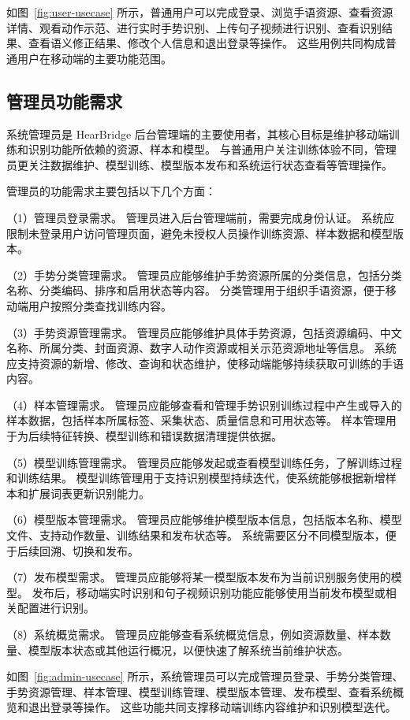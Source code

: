 如图~\ref{fig:user-usecase} 所示，普通用户可以完成登录、浏览手语资源、查看资源详情、观看动作示范、进行实时手势识别、上传句子视频进行识别、查看识别结果、查看语义修正结果、修改个人信息和退出登录等操作。
这些用例共同构成普通用户在移动端的主要功能范围。

\subsection{管理员功能需求}

系统管理员是 HearBridge 后台管理端的主要使用者，其核心目标是维护移动端训练和识别功能所依赖的资源、样本和模型。
与普通用户关注训练体验不同，管理员更关注数据维护、模型训练、模型版本发布和系统运行状态查看等管理操作。

管理员的功能需求主要包括以下几个方面：

（1）管理员登录需求。
管理员进入后台管理端前，需要完成身份认证。
系统应限制未登录用户访问管理页面，避免未授权人员操作训练资源、样本数据和模型版本。

（2）手势分类管理需求。
管理员应能够维护手势资源所属的分类信息，包括分类名称、分类编码、排序和启用状态等内容。
分类管理用于组织手语资源，便于移动端用户按照分类查找训练内容。

（3）手势资源管理需求。
管理员应能够维护具体手势资源，包括资源编码、中文名称、所属分类、封面资源、数字人动作资源或相关示范资源地址等信息。
系统应支持资源的新增、修改、查询和状态维护，使移动端能够持续获取可训练的手语内容。

（4）样本管理需求。
管理员应能够查看和管理手势识别训练过程中产生或导入的样本数据，包括样本所属标签、采集状态、质量信息和可用状态等。
样本管理用于为后续特征转换、模型训练和错误数据清理提供依据。

（5）模型训练管理需求。
管理员应能够发起或查看模型训练任务，了解训练过程和训练结果。
模型训练管理用于支持识别模型持续迭代，使系统能够根据新增样本和扩展词表更新识别能力。

（6）模型版本管理需求。
管理员应能够维护模型版本信息，包括版本名称、模型文件、支持动作数量、训练结果和发布状态等。
系统需要区分不同模型版本，便于后续回溯、切换和发布。

（7）发布模型需求。
管理员应能够将某一模型版本发布为当前识别服务使用的模型。
发布后，移动端实时识别和句子视频识别功能应能够使用当前发布模型或相关配置进行识别。

（8）系统概览需求。
管理员应能够查看系统概览信息，例如资源数量、样本数量、模型版本状态或其他运行概况，以便快速了解系统当前维护状态。


如图~\ref{fig:admin-usecase} 所示，系统管理员可以完成管理员登录、手势分类管理、手势资源管理、样本管理、模型训练管理、模型版本管理、发布模型、查看系统概览和退出登录等操作。
这些功能共同支撑移动端训练内容维护和识别模型迭代。
